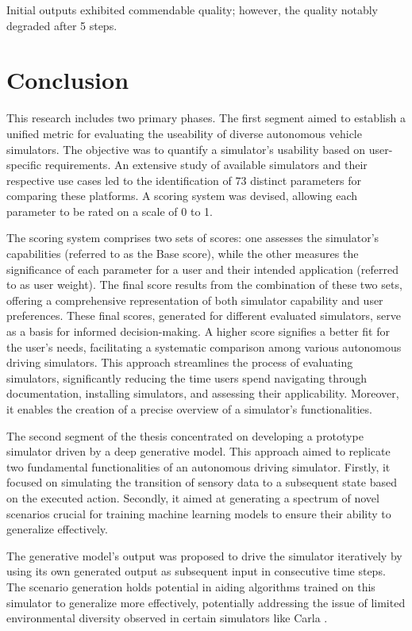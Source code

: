 \documentclass[12pt,twoside,a4paper,parskip]{scrbook} %
\begin{document}
Initial outputs exhibited commendable quality; however, the quality notably degraded after 5 steps.

\chapter{Conclusion}
This research includes two primary phases. The first segment aimed to establish a unified metric for evaluating the useability of diverse autonomous vehicle simulators. The objective was to quantify a simulator's usability based on user-specific requirements. An extensive study of available simulators and their respective use cases led to the identification of 73 distinct parameters for comparing these platforms. A scoring system was devised, allowing each parameter to be rated on a scale of 0 to 1.

The scoring system comprises two sets of scores: one assesses the simulator's capabilities (referred to as the Base score), while the other measures the significance of each parameter for a user and their intended application (referred to as user weight). The final score results from the combination of these two sets, offering a comprehensive representation of both simulator capability and user preferences. These final scores, generated for different evaluated simulators, serve as a basis for informed decision-making. A higher score signifies a better fit for the user's needs, facilitating a systematic comparison among various autonomous driving simulators. This approach streamlines the process of evaluating simulators, significantly reducing the time users spend navigating through documentation, installing simulators, and assessing their applicability. Moreover, it enables the creation of a precise overview of a simulator's functionalities.

The second segment of the thesis concentrated on developing a prototype simulator driven by a deep generative model. This approach aimed to replicate two fundamental functionalities of an autonomous driving simulator. Firstly, it focused on simulating the transition of sensory data to a subsequent state based on the executed action. Secondly, it aimed at generating a spectrum of novel scenarios crucial for training machine learning models to ensure their ability to generalize effectively.

The generative model's output was proposed to drive the simulator iteratively by using its own generated output as subsequent input in consecutive time steps. The scenario generation holds potential in aiding algorithms trained on this simulator to generalize more effectively, potentially addressing the issue of limited environmental diversity observed in certain simulators like Carla \cite{Carla}.
\end{document}
